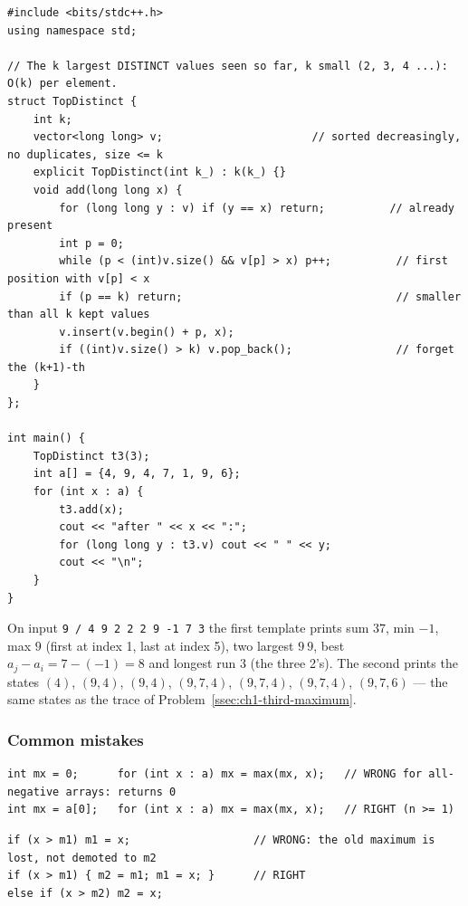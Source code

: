 \begin{lstlisting}[style=cpp]
#include <bits/stdc++.h>
using namespace std;

// The k largest DISTINCT values seen so far, k small (2, 3, 4 ...): O(k) per element.
struct TopDistinct {
    int k;
    vector<long long> v;                       // sorted decreasingly, no duplicates, size <= k
    explicit TopDistinct(int k_) : k(k_) {}
    void add(long long x) {
        for (long long y : v) if (y == x) return;          // already present
        int p = 0;
        while (p < (int)v.size() && v[p] > x) p++;          // first position with v[p] < x
        if (p == k) return;                                 // smaller than all k kept values
        v.insert(v.begin() + p, x);
        if ((int)v.size() > k) v.pop_back();                // forget the (k+1)-th
    }
};

int main() {
    TopDistinct t3(3);
    int a[] = {4, 9, 4, 7, 1, 9, 6};
    for (int x : a) {
        t3.add(x);
        cout << "after " << x << ":";
        for (long long y : t3.v) cout << " " << y;
        cout << "\n";
    }
}
\end{lstlisting}

\begin{insightbox}
On input \texttt{9 / 4 9 2 2 2 9 -1 7 3} the first template prints sum $37$, min $-1$, max $9$ (first at index 1, last at index 5), two largest $9\ 9$, best $a_j - a_i = 7 - (-1) = 8$ and longest run $3$ (the three 2's). The second prints the states $(4)$, $(9,4)$, $(9,4)$, $(9,7,4)$, $(9,7,4)$, $(9,7,4)$, $(9,7,6)$ --- the same states as the trace of Problem~\ref{ssec:ch1-third-maximum}.
\end{insightbox}

\subsubsection*{Common mistakes}

\begin{warningbox}
\begin{lstlisting}[style=snippet]
int mx = 0;      for (int x : a) mx = max(mx, x);   // WRONG for all-negative arrays: returns 0
int mx = a[0];   for (int x : a) mx = max(mx, x);   // RIGHT (n >= 1)
\end{lstlisting}
\end{warningbox}

\begin{warningbox}
\begin{lstlisting}[style=snippet]
if (x > m1) m1 = x;                   // WRONG: the old maximum is lost, not demoted to m2
if (x > m1) { m2 = m1; m1 = x; }      // RIGHT
else if (x > m2) m2 = x;
\end{lstlisting}
\end{warningbox}

